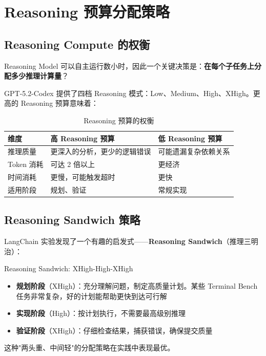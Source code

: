 \section{Reasoning 预算分配策略}

\subsection{Reasoning Compute 的权衡}

Reasoning Model 可以自主运行数小时，因此一个关键决策是：\textbf{在每个子任务上分配多少推理计算量}？

GPT-5.2-Codex 提供了四档 Reasoning 模式：Low、Medium、High、XHigh。更高的 Reasoning 预算意味着：

\begin{table}[H]
\centering
\caption{Reasoning 预算的权衡}
\begin{tabular}{p{3cm}p{5cm}p{5cm}}
\toprule
\textbf{维度} & \textbf{高 Reasoning 预算} & \textbf{低 Reasoning 预算} \\
\midrule
推理质量 & 更深入的分析，更少的逻辑错误 & 可能遗漏复杂依赖关系 \\
Token 消耗 & 可达 2 倍以上 & 更经济 \\
时间消耗 & 更慢，可能触发超时 & 更快 \\
适用阶段 & 规划、验证 & 常规实现 \\
\bottomrule
\end{tabular}
\end{table}

\subsection{Reasoning Sandwich 策略}

LangChain 实验发现了一个有趣的启发式——\textbf{Reasoning Sandwich}（推理三明治）：

\begin{importantbox}{Reasoning Sandwich: XHigh-High-XHigh}
\begin{itemize}[leftmargin=1.5em]
    \item \textbf{规划阶段}（XHigh）：充分理解问题，制定高质量计划。某些 Terminal Bench 任务非常复杂，好的计划能帮助更快到达可行解
    \item \textbf{实现阶段}（High）：按计划执行，不需要最高级别推理
    \item \textbf{验证阶段}（XHigh）：仔细检查结果，捕获错误，确保提交质量
\end{itemize}
这种"两头重、中间轻"的分配策略在实践中表现最优。
\end{importantbox}

